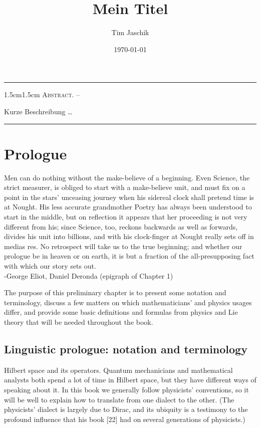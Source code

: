 \documentclass[10pt, letterpaper]{article}
\title{Mein Titel}
\author{Tim Jaschik}
\date{\today}
\renewenvironment{abstract}
  {
    \begin{adjustwidth}{1.5cm}{1.5cm}
    \small
    \textsc{Abstract. –}%
  }
  {
    \end{adjustwidth}
  }
\begin{document}
\maketitle
\rule{\textwidth}{0.5pt}
\begin{abstract}
Kurze Beschreibung …
\end{abstract}
\rule{\textwidth}{0.5pt}
\vspace{0.5cm}

\tableofcontents

\pagebreak

\section*{Prologue}
\begin{displayquote}
Men can do nothing without the make-believe of a beginning. Even Science, the strict measurer, is obliged to start with a make-believe unit, and must fix on a point in the stars' unceasing journey when his sidereal clock shall pretend time is at Nought. His less accurate grandmother Poetry has always been understood to start in the middle, but on reflection it appears that her proceeding is not very different from his; since Science, too, reckons backwards as well as forwards, divides his unit into billions, and with his clock-finger at Nought really sets off in medias res. No retrospect will take us to the true beginning; and whether our prologue be in heaven or on earth, it is but a fraction of the all-presupposing fact with which our story sets out.\\
-George Eliot, Daniel Deronda (epigraph of Chapter 1)
\end{displayquote}

The purpose of this preliminary chapter is to present some notation and terminology, discuss a few matters on which mathematicians' and physics usages differ, and provide some basic definitions and formulas from physics and Lie theory that will be needed throughout the book.

\subsection*{Linguistic prologue: notation and terminology}
Hilbert space and its operators. Quantum mechanicians and mathematical analysts both spend a lot of time in Hilbert space, but they have different ways of speaking about it. In this book we generally follow physicists' conventions, so it will be well to explain how to translate from one dialect to the other. (The physicists' dialect is largely due to Dirac, and its ubiquity is a testimony to the profound influence that his book [22] had on several generations of physicists.)
\end{document}
